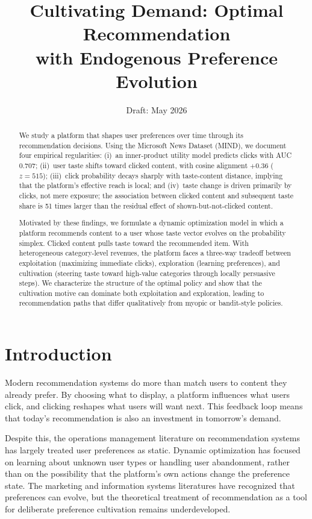 \documentclass[11pt]{article}
\title{Cultivating Demand: Optimal Recommendation\\with Endogenous Preference Evolution}
\author{}
\date{Draft: May 2026}
\begin{document}
\maketitle

\begin{abstract}
We study a platform that shapes user preferences over time through its recommendation decisions. Using the Microsoft News Dataset (MIND), we document four empirical regularities: (i)~an inner-product utility model predicts clicks with AUC 0.707; (ii)~user taste shifts toward clicked content, with cosine alignment $+0.36$ ($z = 515$); (iii)~click probability decays sharply with taste-content distance, implying that the platform's effective reach is local; and (iv)~taste change is driven primarily by clicks, not mere exposure; the association between clicked content and subsequent taste share is 51 times larger than the residual effect of shown-but-not-clicked content.

Motivated by these findings, we formulate a dynamic optimization model in which a platform recommends content to a user whose taste vector evolves on the probability simplex. Clicked content pulls taste toward the recommended item. With heterogeneous category-level revenues, the platform faces a three-way tradeoff between exploitation (maximizing immediate clicks), exploration (learning preferences), and cultivation (steering taste toward high-value categories through locally persuasive steps). We characterize the structure of the optimal policy and show that the cultivation motive can dominate both exploitation and exploration, leading to recommendation paths that differ qualitatively from myopic or bandit-style policies.
\end{abstract}

\section{Introduction}
\label{sec:intro}

Modern recommendation systems do more than match users to content they already prefer. By choosing what to display, a platform influences what users click, and clicking reshapes what users will want next. This feedback loop means that today's recommendation is also an investment in tomorrow's demand.

Despite this, the operations management literature on recommendation systems has largely treated user preferences as static. Dynamic optimization has focused on learning about unknown user types or handling user abandonment, rather than on the possibility that the platform's own actions change the preference state. The marketing and information systems literatures have recognized that preferences can evolve, but the theoretical treatment of recommendation as a tool for deliberate preference cultivation remains underdeveloped.
\end{document}
